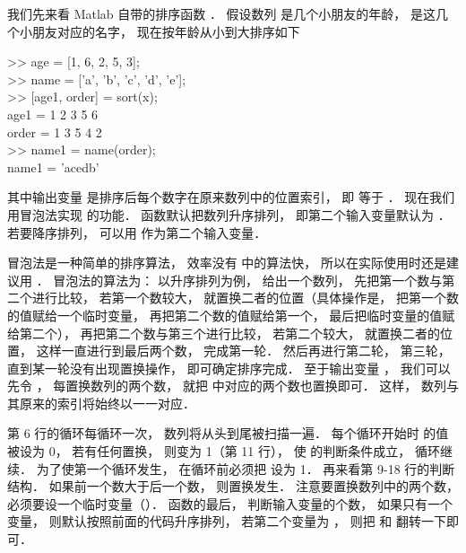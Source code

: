 
我们先来看 Matlab 自带的排序函数 ． 假设数列  是几个小朋友的年龄，  是这几个小朋友对应的名字， 现在按年龄从小到大排序如下
\begin{Command}
>> age = [1, 6, 2, 5, 3];\\
>> name = ['a', 'b', 'c', 'd', 'e'];\\
>> [age1, order] = sort(x);\\
age1 = 1 2 3 5 6\\
order = 1 3 5 4 2\\
>> name1 = name(order);\\
name1 = 'acedb'
\end{Command}
其中输出变量  是排序后每个数字在原来数列中的位置索引， 即  等于 ． 现在我们用冒泡法实现  的功能．  函数默认把数列升序排列， 即第二个输入变量默认为 ． 若要降序排列， 可以用  作为第二个输入变量．

冒泡法是一种简单的排序算法， 效率没有  中的算法快， 所以在实际使用时还是建议用 ． 冒泡法的算法为： 以升序排列为例， 给出一个数列， 先把第一个数与第二个进行比较， 若第一个数较大， 就置换二者的位置（具体操作是， 把第一个数的值赋给一个临时变量， 再把第二个数的值赋给第一个， 最后把临时变量的值赋给第二个）， 再把第二个数与第三个进行比较， 若第二个较大， 就置换二者的位置， 这样一直进行到最后两个数， 完成第一轮． 然后再进行第二轮， 第三轮， 直到某一轮没有出现置换操作， 即可确定排序完成． 至于输出变量 ， 我们可以先令 ， 每置换数列的两个数， 就把  中对应的两个数也置换即可． 这样， 数列与其原来的索引将始终以一一对应． 


第 6 行的循环每循环一次， 数列将从头到尾被扫描一遍． 每个循环开始时  的值被设为 0， 若有任何置换，  则变为 1（第 11 行）， 使  的判断条件成立， 循环继续． 为了使第一个循环发生， 在循环前必须把  设为 1． 再来看第 9-18 行的判断结构． 如果前一个数大于后一个数， 则置换发生． 注意要置换数列中的两个数， 必须要设一个临时变量（）． 函数的最后， 判断输入变量的个数， 如果只有一个变量， 则默认按照前面的代码升序排列， 若第二个变量为 ， 则把  和  翻转一下即可．